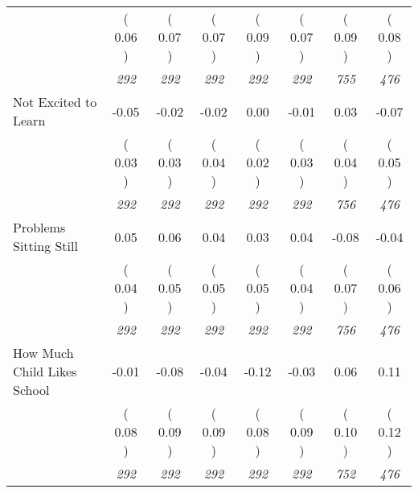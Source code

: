 \begin{tabular}{l c c c c c c c}
& (     0.06 ) & (     0.07 ) & (     0.07 ) & (     0.09 ) & (     0.07 ) & (     0.09 ) & (     0.08 ) \\
& \textit{ 292 } & \textit{ 292 } & \textit{ 292 } & \textit{ 292 } & \textit{ 292 } & \textit{ 755 } & \textit{ 476 } \\
Not Excited to Learn &     -0.05 &     -0.02 &     -0.02 &      0.00 &     -0.01 &      0.03 &     -0.07 \\
& (     0.03 ) & (     0.03 ) & (     0.04 ) & (     0.02 ) & (     0.03 ) & (     0.04 ) & (     0.05 ) \\
& \textit{ 292 } & \textit{ 292 } & \textit{ 292 } & \textit{ 292 } & \textit{ 292 } & \textit{ 756 } & \textit{ 476 } \\
Problems Sitting Still &      0.05 &      0.06 &      0.04 &      0.03 &      0.04 &     -0.08 &     -0.04 \\
& (     0.04 ) & (     0.05 ) & (     0.05 ) & (     0.05 ) & (     0.04 ) & (     0.07 ) & (     0.06 ) \\
& \textit{ 292 } & \textit{ 292 } & \textit{ 292 } & \textit{ 292 } & \textit{ 292 } & \textit{ 756 } & \textit{ 476 } \\
How Much Child Likes School &     -0.01 &     -0.08 &     -0.04 &     -0.12 &     -0.03 &      0.06 &      0.11 \\
& (     0.08 ) & (     0.09 ) & (     0.09 ) & (     0.08 ) & (     0.09 ) & (     0.10 ) & (     0.12 ) \\
& \textit{ 292 } & \textit{ 292 } & \textit{ 292 } & \textit{ 292 } & \textit{ 292 } & \textit{ 752 } & \textit{ 476 } \\
\bottomrule
\end{tabular}
